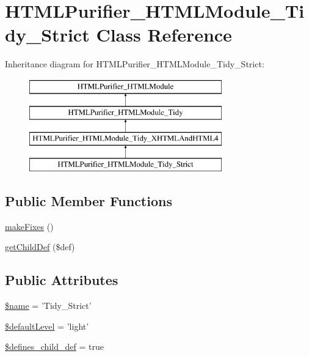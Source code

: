 \hypertarget{classHTMLPurifier__HTMLModule__Tidy__Strict}{\section{H\+T\+M\+L\+Purifier\+\_\+\+H\+T\+M\+L\+Module\+\_\+\+Tidy\+\_\+\+Strict Class Reference}
\label{classHTMLPurifier__HTMLModule__Tidy__Strict}
}
Inheritance diagram for H\+T\+M\+L\+Purifier\+\_\+\+H\+T\+M\+L\+Module\+\_\+\+Tidy\+\_\+\+Strict\+:\begin{figure}[H]
\begin{center}
\leavevmode
\includegraphics[height=4.000000cm]{classHTMLPurifier__HTMLModule__Tidy__Strict}
\end{center}
\end{figure}
\subsection*{Public Member Functions}
\begin{DoxyCompactItemize}
\item 
\hyperlink{classHTMLPurifier__HTMLModule__Tidy__Strict_a00e0942d74a524791e744456cbd9aeb9}{make\+Fixes} ()
\item 
\hyperlink{classHTMLPurifier__HTMLModule__Tidy__Strict_ab2a9cfffb5fa1009c46264f945fa5873}{get\+Child\+Def} (\$def)
\end{DoxyCompactItemize}
\subsection*{Public Attributes}
\begin{DoxyCompactItemize}
\item 
\hyperlink{classHTMLPurifier__HTMLModule__Tidy__Strict_a212a9bfe79289fecd8731681147312f0}{\$name} = 'Tidy\+\_\+\+Strict'
\item 
\hyperlink{classHTMLPurifier__HTMLModule__Tidy__Strict_a93f21b040f167375e2d04a2cf2436b5a}{\$default\+Level} = 'light'
\item 
\hyperlink{classHTMLPurifier__HTMLModule__Tidy__Strict_aafc8f8c916922ec526359a47db648a44}{\$defines\+\_\+child\+\_\+def} = true
\end{DoxyCompactItemize}


